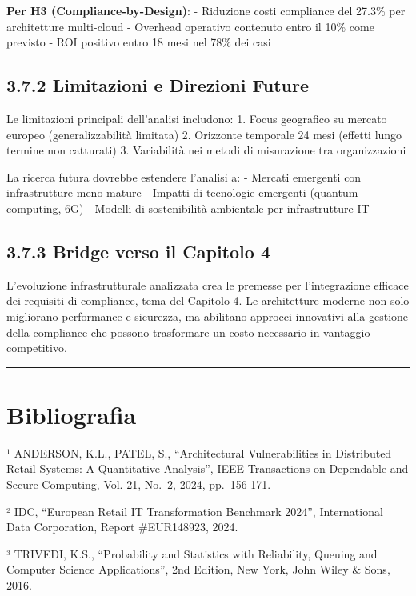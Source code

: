 \documentclass[12pt,a4paper,oneside]{book}
\numberwithin{figure}{chapter} %
\numberwithin{table}{chapter}  %
\begin{document}
\textbf{Per H3 (Compliance-by-Design)}: - Riduzione costi compliance del
27.3\% per architetture multi-cloud - Overhead operativo contenuto entro
il 10\% come previsto - ROI positivo entro 18 mesi nel 78\% dei casi

\subsection{3.7.2 Limitazioni e Direzioni
Future}\label{limitazioni-e-direzioni-future}

Le limitazioni principali dell'analisi includono: 1. Focus geografico su
mercato europeo (generalizzabilità limitata) 2. Orizzonte temporale 24
mesi (effetti lungo termine non catturati) 3. Variabilità nei metodi di
misurazione tra organizzazioni

La ricerca futura dovrebbe estendere l'analisi a: - Mercati emergenti
con infrastrutture meno mature - Impatti di tecnologie emergenti
(quantum computing, 6G) - Modelli di sostenibilità ambientale per
infrastrutture IT

\subsection{3.7.3 Bridge verso il Capitolo
4}\label{bridge-verso-il-capitolo-4}

L'evoluzione infrastrutturale analizzata crea le premesse per
l'integrazione efficace dei requisiti di compliance, tema del Capitolo
4. Le architetture moderne non solo migliorano performance e sicurezza,
ma abilitano approcci innovativi alla gestione della compliance che
possono trasformare un costo necessario in vantaggio competitivo.

\begin{center}\rule{0.5\linewidth}{0.5pt}\end{center}

\section{Bibliografia}\label{bibliografia}

¹ ANDERSON, K.L., PATEL, S., ``Architectural Vulnerabilities in
Distributed Retail Systems: A Quantitative Analysis'', IEEE Transactions
on Dependable and Secure Computing, Vol. 21, No.~2, 2024, pp.~156-171.

² IDC, ``European Retail IT Transformation Benchmark 2024'',
International Data Corporation, Report \#EUR148923, 2024.

³ TRIVEDI, K.S., ``Probability and Statistics with Reliability, Queuing
and Computer Science Applications'', 2nd Edition, New York, John Wiley
\& Sons, 2016.
\end{document}
